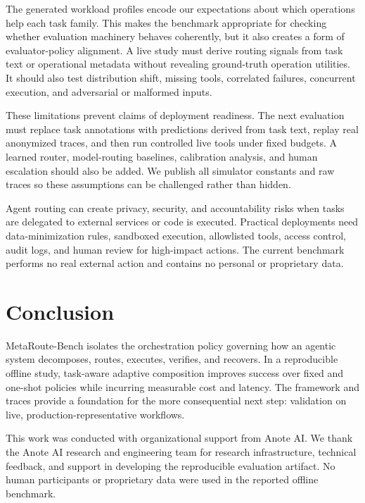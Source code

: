 \documentclass[sigconf]{acmart}
\begin{document}
The generated workload profiles encode our expectations about which operations help each task family. This makes the benchmark appropriate for checking whether evaluation machinery behaves coherently, but it also creates a form of evaluator-policy alignment. A live study must derive routing signals from task text or operational metadata without revealing ground-truth operation utilities. It should also test distribution shift, missing tools, correlated failures, concurrent execution, and adversarial or malformed inputs.

These limitations prevent claims of deployment readiness. The next evaluation must replace task annotations with predictions derived from task text, replay real anonymized traces, and then run controlled live tools under fixed budgets. A learned router, model-routing baselines, calibration analysis, and human escalation should also be added. We publish all simulator constants and raw traces so these assumptions can be challenged rather than hidden.

Agent routing can create privacy, security, and accountability risks when tasks are delegated to external services or code is executed. Practical deployments need data-minimization rules, sandboxed execution, allowlisted tools, access control, audit logs, and human review for high-impact actions. The current benchmark performs no real external action and contains no personal or proprietary data.

\section{Conclusion}

MetaRoute-Bench isolates the orchestration policy governing how an agentic system decomposes, routes, executes, verifies, and recovers. In a reproducible offline study, task-aware adaptive composition improves success over fixed and one-shot policies while incurring measurable cost and latency. The framework and traces provide a foundation for the more consequential next step: validation on live, production-representative workflows.

\begin{acks}
This work was conducted with organizational support from Anote AI. We thank the Anote AI research and engineering team for research infrastructure, technical feedback, and support in developing the reproducible evaluation artifact. No human participants or proprietary data were used in the reported offline benchmark.
\end{acks}
\end{document}
